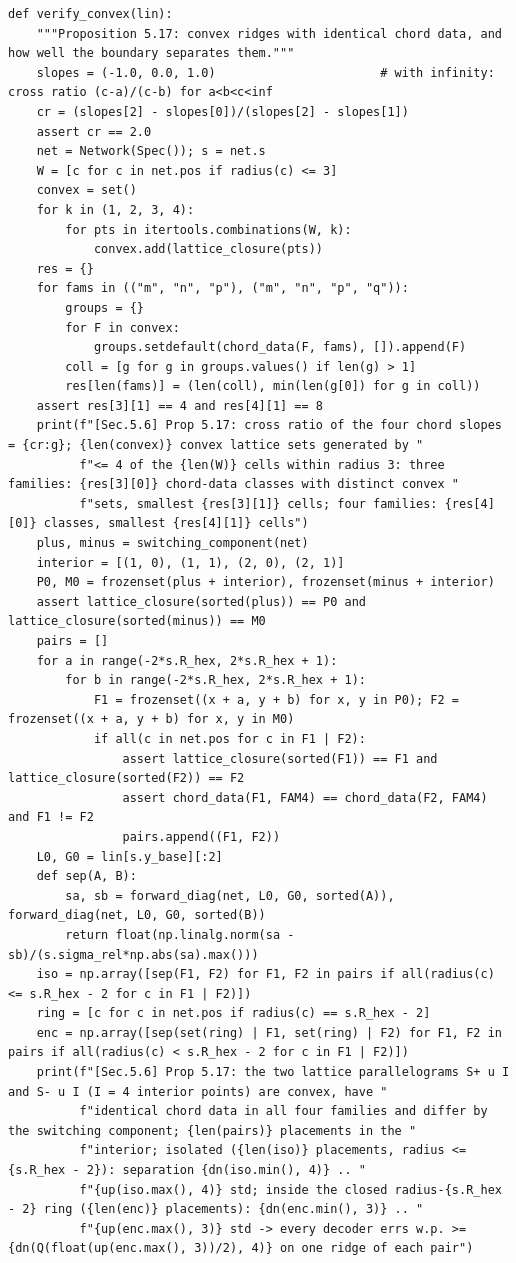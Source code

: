 \documentclass[11pt,a4paper]{article}
\theoremstyle{definition}
\theoremstyle{remark}
\begin{document}
\begin{lstlisting}
def verify_convex(lin):
    """Proposition 5.17: convex ridges with identical chord data, and how well the boundary separates them."""
    slopes = (-1.0, 0.0, 1.0)                       # with infinity: cross ratio (c-a)/(c-b) for a<b<c<inf
    cr = (slopes[2] - slopes[0])/(slopes[2] - slopes[1])
    assert cr == 2.0
    net = Network(Spec()); s = net.s
    W = [c for c in net.pos if radius(c) <= 3]
    convex = set()
    for k in (1, 2, 3, 4):
        for pts in itertools.combinations(W, k):
            convex.add(lattice_closure(pts))
    res = {}
    for fams in (("m", "n", "p"), ("m", "n", "p", "q")):
        groups = {}
        for F in convex:
            groups.setdefault(chord_data(F, fams), []).append(F)
        coll = [g for g in groups.values() if len(g) > 1]
        res[len(fams)] = (len(coll), min(len(g[0]) for g in coll))
    assert res[3][1] == 4 and res[4][1] == 8
    print(f"[Sec.5.6] Prop 5.17: cross ratio of the four chord slopes = {cr:g}; {len(convex)} convex lattice sets generated by "
          f"<= 4 of the {len(W)} cells within radius 3: three families: {res[3][0]} chord-data classes with distinct convex "
          f"sets, smallest {res[3][1]} cells; four families: {res[4][0]} classes, smallest {res[4][1]} cells")
    plus, minus = switching_component(net)
    interior = [(1, 0), (1, 1), (2, 0), (2, 1)]
    P0, M0 = frozenset(plus + interior), frozenset(minus + interior)
    assert lattice_closure(sorted(plus)) == P0 and lattice_closure(sorted(minus)) == M0
    pairs = []
    for a in range(-2*s.R_hex, 2*s.R_hex + 1):
        for b in range(-2*s.R_hex, 2*s.R_hex + 1):
            F1 = frozenset((x + a, y + b) for x, y in P0); F2 = frozenset((x + a, y + b) for x, y in M0)
            if all(c in net.pos for c in F1 | F2):
                assert lattice_closure(sorted(F1)) == F1 and lattice_closure(sorted(F2)) == F2
                assert chord_data(F1, FAM4) == chord_data(F2, FAM4) and F1 != F2
                pairs.append((F1, F2))
    L0, G0 = lin[s.y_base][:2]
    def sep(A, B):
        sa, sb = forward_diag(net, L0, G0, sorted(A)), forward_diag(net, L0, G0, sorted(B))
        return float(np.linalg.norm(sa - sb)/(s.sigma_rel*np.abs(sa).max()))
    iso = np.array([sep(F1, F2) for F1, F2 in pairs if all(radius(c) <= s.R_hex - 2 for c in F1 | F2)])
    ring = [c for c in net.pos if radius(c) == s.R_hex - 2]
    enc = np.array([sep(set(ring) | F1, set(ring) | F2) for F1, F2 in pairs if all(radius(c) < s.R_hex - 2 for c in F1 | F2)])
    print(f"[Sec.5.6] Prop 5.17: the two lattice parallelograms S+ u I and S- u I (I = 4 interior points) are convex, have "
          f"identical chord data in all four families and differ by the switching component; {len(pairs)} placements in the "
          f"interior; isolated ({len(iso)} placements, radius <= {s.R_hex - 2}): separation {dn(iso.min(), 4)} .. "
          f"{up(iso.max(), 4)} std; inside the closed radius-{s.R_hex - 2} ring ({len(enc)} placements): {dn(enc.min(), 3)} .. "
          f"{up(enc.max(), 3)} std -> every decoder errs w.p. >= {dn(Q(float(up(enc.max(), 3))/2), 4)} on one ridge of each pair")



\end{lstlisting}
\end{document}
